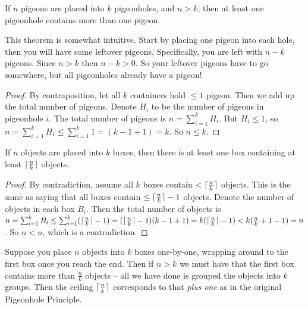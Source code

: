 \documentclass[main.tex]{subfiles}
\begin{document}
\begin{thm}
	If \(n\) pigeons are placed into \(k\) pigeonholes, and \(n > k\), then at least one pigeonhole contains more than one pigeon.
\end{thm}

\begin{rem}
	This theorem is somewhat intuitive. Start by placing one pigeon into each hole, then you will have some leftover pigeons. Specifically, you are left with \(n-k\) pigeons. Since \(n > k\) then \(n-k > 0\). So your leftover pigeons have to go somewhere, but all pigeonholes already have a pigeon!
\end{rem}

\begin{proof}
	By contraposition, let all \(k\) containers hold \(\leq 1\) pigeon. Then we add up the total number of pigeons. Denote \(H_i\) to be the number of pigeons in pigeonhole \(i\). The total number of pigeons is \(n = \sum_{i=1}^{k} H_i\). But \(H_i \leq 1\), so \(n = \sum_{i=1}^{k} H_i \leq \sum_{i=1}^{k} 1 = (k-1+1) = k\). So \(n \leq k\).
\end{proof}


\begin{thm}
	If \(n\) objects are placed into \(k\) boxes, then there is at least one box containing at least \(\lceil\frac{n}{k}\rceil\) objects.
\end{thm}

\begin{proof}
	By contradiction, assume all \(k\) boxes contain \(< \lceil\frac{n}{k}\rceil\) objects. This is the same as saying that all boxes contain \(\leq \lceil\frac{n}{k}\rceil-1\) objects. Denote the number of objects in each box \(B_i\). Then the total number of objects is \(n = \sum_{i=1}^{k} B_i \leq \sum_{i=1}^{k} (\lceil\frac{n}{k}\rceil - 1) = (\lceil\frac{n}{k}\rceil - 1)(k-1+1) = k(\lceil\frac{n}{k}\rceil - 1) < k(\frac{n}{k} + 1 - 1) = n\). So \(n < n\), which is a contradiction.
\end{proof}

\begin{rem}
	Suppose you place \(n\) objects into \(k\) boxes one-by-one, wrapping around to the first box once you reach the end. Then if \(n > k\) we must have that the first box contains more than \(\frac{n}{k}\) objects -- all we have done is grouped the objects into \(k\) groups. Then the ceiling \(\lceil\frac{n}{k}\rceil\) corresponds to that \textit{plus one} as in the original Pigeonhole Principle.
\end{rem}
\end{document}
